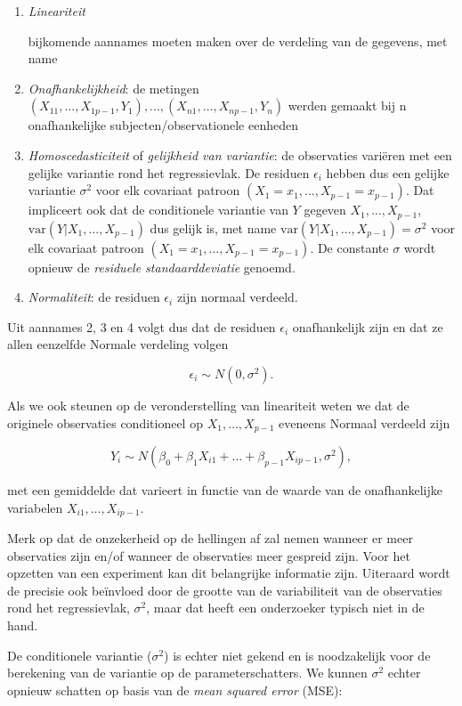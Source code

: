 \documentclass[
  12pt,dutch,coursenotes]{book}
\begin{document}
\begin{enumerate}
\def\labelenumi{\arabic{enumi}.}
\item
  \emph{Lineariteit}

  bijkomende aannames moeten maken over de verdeling van de gegevens, met name
\item
  \emph{Onafhankelijkheid}: de metingen \((X_{11},\dots, X_{1p-1}, Y_1), ..., (X_{n1},\ldots,X_{np-1},Y_n)\) werden gemaakt bij n onafhankelijke subjecten/observationele eenheden
\item
  \emph{Homoscedasticiteit} of \emph{gelijkheid van variantie}: de observaties variëren met een gelijke variantie rond het regressievlak. De residuen \(\epsilon_i\) hebben dus een gelijke variantie \(\sigma^2\) voor elk covariaat patroon \((X_1=x_1, ..., X_{p-1}=x_{p-1})\). Dat impliceert ook dat de conditionele variantie van \(Y\) gegeven \(X_1,\ldots,X_{p-1}\), \(\text{var}(Y\vert X_1,\ldots,X_{p-1})\) dus gelijk is, met name \(\text{var}(Y\vert X_1,\ldots,X_{p-1}) = \sigma^2\) voor elk covariaat patroon \((X_1=x_1, ..., X_{p-1}=x_{p-1})\). De constante \(\sigma\) wordt opnieuw de \emph{residuele standaarddeviatie} genoemd.
\item
  \emph{Normaliteit}: de residuen \(\epsilon_i\) zijn normaal verdeeld.
\end{enumerate}

Uit aannames 2, 3 en 4 volgt dus dat de residuen \(\epsilon_i\) onafhankelijk zijn en dat ze allen eenzelfde Normale verdeling volgen

\[\epsilon_i \sim N(0,\sigma^2).\]

Als we ook steunen op de veronderstelling van lineariteit weten we dat de originele observaties conditioneel op \(X_1,\ldots,X_{p-1}\) eveneens Normaal verdeeld zijn

\[Y_i\sim N(\beta_0+\beta_1 X_{i1}+\ldots+\beta_{p-1} X_{ip-1},\sigma^2),\]

met een gemiddelde dat varieert in functie van de waarde van de onafhankelijke variabelen \(X_{i1},\ldots,X_{ip-1}\).

Merk op dat de onzekerheid op de hellingen af zal nemen wanneer er meer observaties zijn en/of wanneer de observaties meer gespreid zijn. Voor het opzetten van een experiment kan dit belangrijke informatie zijn. Uiteraard wordt de precisie ook beïnvloed door de grootte van de variabiliteit van de observaties rond het regressievlak, \(\sigma^2\), maar dat heeft een onderzoeker typisch niet in de hand.

De conditionele variantie (\(\sigma^2\)) is echter niet gekend en is noodzakelijk voor de berekening van de variantie op de parameterschatters. We kunnen \(\sigma^2\) echter opnieuw schatten op basis van de \emph{mean squared error} (MSE):
\end{document}
